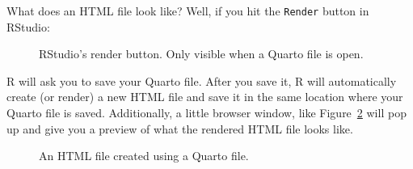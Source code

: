 \documentclass[
  letterpaper,
  DIV=11,
  numbers=noendperiod]{scrreprt}
\begin{document}
What does an HTML file look like? Well, if you hit the \texttt{Render}
button in RStudio:

\begin{figure}


\caption{\label{fig-render}RStudio's render button. Only visible when a
Quarto file is open.}

\end{figure}%

R will ask you to save your Quarto file. After you save it, R will
automatically create (or render) a new HTML file and save it in the same
location where your Quarto file is saved. Additionally, a little browser
window, like Figure~\ref{fig-rendered-quarto-document} will pop up and
give you a preview of what the rendered HTML file looks like.

\begin{figure}


\caption{\label{fig-rendered-quarto-document}An HTML file created using
a Quarto file.}

\end{figure}%
\end{document}

